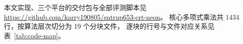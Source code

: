 本文实现、三个平台的交付包与全部评测脚本见
\url{https://github.com/karry190805/sntrup653-crt-neon}。
核心多项式乘法共 1434 行，按算法层次切分为 19 个分块文件，
逐块的行号与文件对应关系见表~\ref{tab:code-map}。
